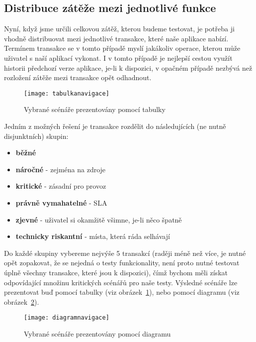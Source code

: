 \documentclass[122pt,oneside]{fithesis}
\begin{document}
\subsection{Distribuce zátěže mezi jednotlivé funkce}

Nyní, když jsme určili celkovou zátěž, kterou budeme testovat, je potřeba ji vhodně distribuovat mezi jednotlivé transakce, které naše aplikace nabízí. Termínem transakce se v tomto případě myslí jakákoliv operace, kterou může uživatel s naší aplikací vykonat. I v tomto případě je nejlepší cestou využít historii předchozí verze aplikace, je-li k dispozici, v opačném případě nezbývá než rozložení zátěže mezi transakce opět odhadnout. 

\begin{figure}[!ht]
\centering
\texttt{[image: tabulkanavigace]}
\caption{Vybrané scénáře prezentovány pomocí tabulky~\cite{molyneaux09}}
\label{img:tabulkaNavigace}
\end{figure}

Jedním z možných řešení je transakce rozdělit do následujících (ne nutně disjunktních) skupin:
\begin{itemize}
  \item {\bf běžné}
  \item {\bf náročné} - zejména na zdroje
  \item {\bf kritické} - zásadní pro provoz
  \item {\bf právně vymahatelné} - SLA
  \item {\bf zjevné} - uživatel si okamžitě všimne, je-li něco špatně
  \item {\bf technicky riskantní} - místa, která ráda selhávají
\end{itemize}

Do každé skupiny vybereme nejvýše 5 transakcí (raději méně než více, je nutné opět zopakovat, že se nejedná o testy funkcionality, není proto nutné testovat úplně všechny transakce, které jsou k dispozici), čímž bychom měli získat odpovídající množinu kritických scénářů pro naše testy. Výsledné scénáře lze prezentovat buď pomocí tabulky (viz obrázek~\ref{img:tabulkaNavigace}), nebo pomocí diagramu (viz obrázek~\ref{img:diagramNavigace}).

\begin{figure}[!ht]
\centering
\texttt{[image: diagramnavigace]}
\caption{Vybrané scénáře prezentovány pomocí diagramu}
\label{img:diagramNavigace}
\end{figure}
\end{document}
